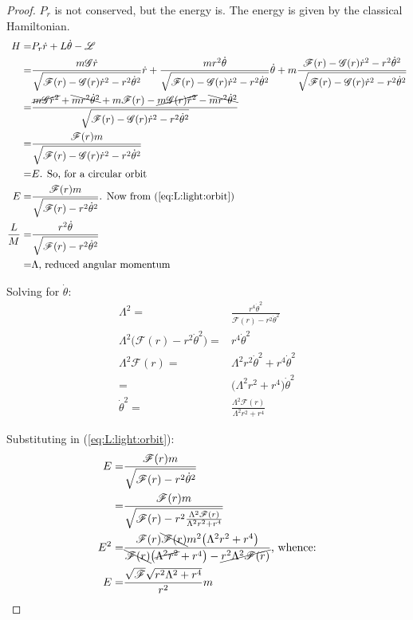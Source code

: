 \documentclass[]{article}
\newcommand{\Lagr}{\mathscr{L}}
\begin{document}
{\begin{proof}
	$P_r$ is not conserved, but the energy is. The energy is given by the classical Hamiltonian.
	\begin{align*}
		H =& P_r \dot{r} + L \dot{\theta} - \Lagr\\
		=& \frac{m \mathscr{G} \dot{r}}{\sqrt{\mathscr{F}(r)-\mathscr{G}(r)\dot{r}^2 - r^2 \dot{\theta}^2}}\dot{r} + \frac{m r^2 \dot{\theta}}{\sqrt{\mathscr{F}(r)-\mathscr{G}(r)\dot{r}^2 - r^2 \dot{\theta}^2}}\dot{\theta}  +m \frac{\mathscr{F}(r)-\mathscr{G}(r)\dot{r}^2 - r^2 \dot{\theta}^2}{\sqrt{\mathscr{F}(r)-\mathscr{G}(r)\dot{r}^2 - r^2 \dot{\theta}^2}}\\
		=& \frac{\cancel{m \mathscr{G} \dot{r}^2} + \bcancel{m r^2\dot{\theta}^2} + m\mathscr{F}(r)-\cancel{m\mathscr{G}(r)\dot{r}^2} - \bcancel{mr^2 \dot{\theta}^2} }{\sqrt{\mathscr{F}(r)-\mathscr{G}(r)\dot{r}^2 - r^2 \dot{\theta}^2}}\\
		=& \frac{\mathscr{F}(r)m}{\sqrt{\mathscr{F}(r)-\mathscr{G}(r)\dot{r}^2 - r^2 \dot{\theta}^2}} \\
		=& E \text{. So, for a circular orbit}\\
		E =& \frac{\mathscr{F}(r)m}{\sqrt{\mathscr{F}(r)- r^2 \dot{\theta}^2}} \text{. Now from (\ref{eq:L:light:orbit})}\\
		\frac{L}{M} =& \frac{r^2 \dot{\theta}}{\sqrt{\mathscr{F}(r) - r^2 \dot{\theta}^2}}\\
		=& \Lambda \text{, reduced angular momentum}
	\end{align*}
	
	Solving for $\dot{\theta}$:
	\begin{align*}
		\Lambda^2 =& \frac{r^4 \dot{\theta}^2}{\mathscr{F}(r) - r^2 \dot{\theta}^2}\\
		\Lambda^2 \big(\mathscr{F}(r) - r^2 \dot{\theta}^2\big)	=& r^4 \dot{\theta}^2\\
		\Lambda^2 \mathscr{F}(r) =& \Lambda^2 r^2 \dot{\theta}^2 +  r^4 \dot{\theta}^2\\
		=& \big(\Lambda^2 r^2  +  r^4\big) \dot{\theta}^2\\
		\dot{\theta}^2=& \frac{\Lambda^2 \mathscr{F}(r)}{\Lambda^2 r^2  +  r^4}
	\end{align*}
	
	Substituting in (\ref{eq:L:light:orbit}):
	\begin{align*}
		E =& \frac{\mathscr{F}(r)m}{\sqrt{\mathscr{F}(r)- r^2 \dot{\theta}^2}}\\
		=&  \frac{\mathscr{F}(r)m}{\sqrt{\mathscr{F}(r)- r^2 \frac{\Lambda^2 \mathscr{F}(r)}{\Lambda^2 r^2  +  r^4}}}\\
		E^2=&  \frac{\mathscr{F}(r) \bcancel{\mathscr{F}(r)}m^2 \big(\Lambda^2 r^2  +  r^4\big)}{\bcancel{\mathscr{F}(r)}\big(\cancel{\Lambda^2 r^2}  +  r^4\big)- \cancel{r^2 \Lambda^2 \mathscr{F}(r)}} \text{, whence:}\\
		E =& \frac{\sqrt{\mathscr{F}} \sqrt{r^2 \Lambda^2 + r^4}}{r^2} m
	\end{align*}
	

\end{proof}}
\end{document}

